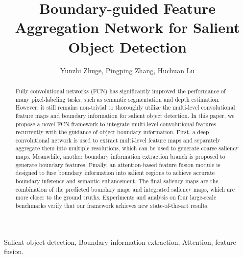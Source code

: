 \documentclass[journal]{IEEEtran}
\begin{document}
%
\title{Boundary-guided Feature Aggregation Network for Salient Object Detection}
\author{Yunzhi Zhuge, Pingping Zhang, Huchuan Lu}
\maketitle




\begin{abstract}
Fully convolutional networks (FCN) has significantly improved the performance of many pixel-labeling tasks, such as semantic segmentation and depth estimation.
%
However, it still remains non-trivial to thoroughly utilize the multi-level convolutional feature maps and boundary information for salient object detection.
%
In this paper, we propose a novel FCN framework to integrate multi-level convolutional features recurrently with the guidance of object boundary information.
%
First, a deep convolutional network is used to extract multi-level feature maps and separately aggregate them into multiple resolutions, which can be used to generate coarse saliency maps.
%
Meanwhile, another boundary information extraction branch is proposed to generate boundary features.
%
Finally, an attention-based feature fusion module is designed to fuse boundary information into salient regions to achieve accurate boundary inference and semantic enhancement.
%
The final saliency maps are the combination of the predicted boundary maps and integrated saliency maps, which are more closer to the ground truths.
%
Experiments and analysis on four large-scale benchmarks verify that our framework achieves new state-of-the-art results.
\end{abstract}



\begin{IEEEkeywords}
Salient object detection, Boundary information extraction, Attention, feature fusion.
\end{IEEEkeywords}
\end{document}
